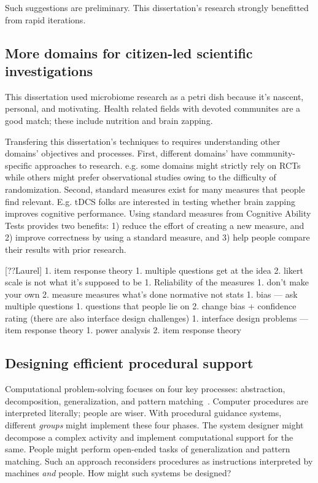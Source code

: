 Such suggestions are preliminary. This dissertation's research strongly benefitted from rapid iterations.

\subsection{More domains for citizen-led scientific investigations}

This dissertation used microbiome research as a petri dish because it’s nascent, personal, and motivating. Health related fields with devoted communites are a good match; these include nutrition and brain zapping. 

Transfering this dissertation's techniques to requires understanding other domains' objectives and processes. First, different domains' have community-specific approaches to research. e.g. some domains might strictly rely on RCTs while others might prefer observational studies owing to the difficulty of randomization. Second, standard measures exist for many measures that people find relevant. E.g. tDCS folks are interested in testing whether brain zapping improves cognitive performance.  Using standard measures from Cognitive Ability Tests provides two benefits: 1) reduce the effort of creating a new measure, and 2) improve correctness by using a standard measure, and 3) help people compare their results with prior research.

[??Laurel] 1. item response theory
    1. multiple questions get at the idea
    2. likert scale is not what it’s supposed to be
1. Reliability of the measures
    1. don’t make your own
    2. measure measures what’s done
normative not stats
1. bias — ask multiple questions
    1. questions that people lie on
    2. change bias + confidence rating 
(there are also interface design challenges)
1. interface design problems — item response theory
    1. power analysis 
    2. item response theory

\subsection{Designing efficient procedural support}
Computational problem-solving focuses on four key processes: abstraction, decomposition, generalization, and pattern matching~\cite{Wing2006}. Computer procedures are interpreted literally; people are wiser. With procedural guidance systems, different \textit{groups} might implement these four phases. The system designer might decompose a complex activity and implement computational support for the same. People might perform open-ended tasks of generalization and pattern matching. Such an approach reconsiders procedures as instructions interpreted by machines \textit{and} people. How might such systems be designed?

